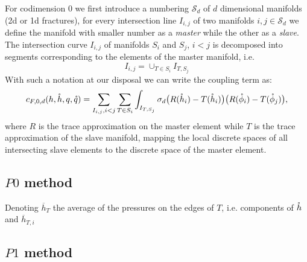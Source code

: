 For codimension 0 we first introduce a numbering $\mathcal{S}_d$ of $d$ dimensional manifolds (2d or 1d fractures), for every intersection line $I_{i,j}$ 
of two manifolds  $i,j \in \mathcal{S}_d$ we define the manifold with smaller number as a \emph{master} while the other as a \emph{slave}. 
The intersection curve $I_{i,j}$ of manifolds $S_i$ and $S_j$, $i<j$ is decomposed into segments corresponding to the elements of the master manifold, i.e.
\[
    I_{i,j} =\cup_{T\in S_i} I_{T, S_j}
\]    
With such a notation at our disposal we can write the coupling term as:
\begin{equation*}
  c_{F,0,d}(h, \mathring h, q, \mathring q) =  \sum_{I_{i,j}, i<j} \sum_{T\in S_i} \int_{I_{T, S_j}} \sigma_d
                \big(R({\mathring{h}_i}) - T({\mathring{h}_{i}}) \big)
                 \big(R({\mathring{\phi}_i}) - T({\mathring{\phi}_{j}}) \big),
\end{equation*}
where $R$ is the trace approximation on the master element while $T$ is the trace approximation of the slave manifold, mapping
the local discrete spaces of all intersecting slave elements to the discrete space of the master element.



\subsection{$P0$ method}
Denoting $\overline{h}_T$ the average of the pressures on the edges of $T$, i.e. components of $\mathring h$ and $\overline{h}_{T,i}$

\subsection{$P1$ method}


